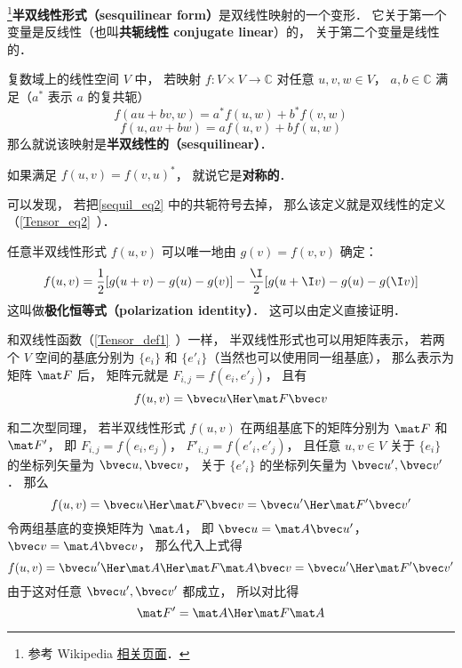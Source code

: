 
\begin{issues}
\issueDraft
\end{issues}

\footnote{参考 Wikipedia \href{https://en.wikipedia.org/wiki/Sesquilinear_form}{相关页面}．}\textbf{半双线性形式（sesquilinear form）}是双线性映射的一个变形． 它关于第一个变量是反线性（也叫\textbf{共轭线性 conjugate linear}）的， 关于第二个变量是线性的．
\begin{definition}{}\label{sequil_def1}
复数域上的线性空间 $V$ 中， 若映射 $f:V\times V\to \mathbb C$ 对任意 $u, v, w\in V$， $a,b\in \mathbb C$ 满足（$a^*$ 表示 $a$ 的复共轭）
\begin{equation}\label{sequil_eq2}
f(au+bv, w) = a^*f(u, w) + b^*f(v, w)
\end{equation}
\begin{equation}\label{sequil_eq1}
f(u, av+bw) = af(u, v) + bf(u, w)
\end{equation}
那么就说该映射是\textbf{半双线性的（sesquilinear）}．
\end{definition}
如果满足 $f(u, v) = f(v, u)^*$， 就说它是\textbf{对称的}．

可以发现， 若把\autoref{sequil_eq2} 中的共轭符号去掉， 那么该定义就是双线性的定义（\autoref{Tensor_eq2}~）．

任意半双线性形式 $f(u, v)$ 可以唯一地由 $g(v) = f(v, v)$ 确定：
\begin{equation}
f(u, v) =\frac{1}{2}[g(u+v)-g(u)-g(v)]
-\frac{\I}{2}[g(u+\I v)-g(u)-g(\I v)]
\end{equation}
这叫做\textbf{极化恒等式（polarization identity）}． 这可以由定义直接证明．

和双线性函数（\autoref{Tensor_def1}~）一样， 半双线性形式也可以用矩阵表示， 若两个 $V$ 空间的基底分别为 $\{e_i\}$ 和 $\{e'_i\}$（当然也可以使用同一组基底）， 那么表示为矩阵 $\mat F$ 后， 矩阵元就是 $F_{i,j} = f(e_i, e'_j)$， 且有
\begin{equation}
f(u, v) = \bvec u\Her \mat F \bvec v
\end{equation}

和二次型同理， 若半双线性形式 $f(u, v)$ 在两组基底下的矩阵分别为 $\mat F$ 和 $\mat F'$， 即 $F_{i,j} = f(e_i, e_j)$， $F'_{i,j} = f(e'_i, e'_j)$， 且任意 $u, v\in V$ 关于 $\{e_i\}$ 的坐标列矢量为 $\bvec u, \bvec v$， 关于 $\{e'_i\}$ 的坐标列矢量为 $\bvec u', \bvec v'$． 那么
\begin{equation}
f(u, v) = \bvec u\Her \mat F \bvec v = \bvec u'\Her \mat F' \bvec v'
\end{equation}
令两组基底的变换矩阵为 $\mat A$， 即 $\bvec u = \mat A\bvec u'$， $\bvec v = \mat A \bvec v$， 那么代入上式得
\begin{equation}
f(u, v) = \bvec u'\Her \mat A\Her \mat F \mat A\bvec v = \bvec u'\Her \mat F' \bvec v'
\end{equation}
由于这对任意 $\bvec u', \bvec v'$ 都成立， 所以对比得
\begin{equation}
\mat F' = \mat A\Her \mat F \mat A
\end{equation}




